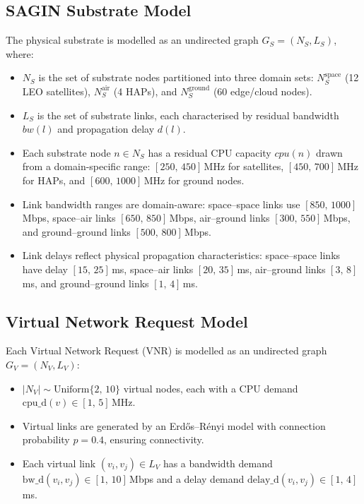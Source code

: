\documentclass[12pt,a4paper]{report}
\begin{document}
\subsection{SAGIN Substrate Model}

The physical substrate is modelled as an undirected graph $G_S = (N_S, L_S)$, where:
\begin{itemize}[leftmargin=*]
  \item $N_S$ is the set of substrate nodes partitioned into three domain sets:
        $N_S^{\text{space}}$ (12 LEO satellites), $N_S^{\text{air}}$ (4 HAPs), and
        $N_S^{\text{ground}}$ (60 edge/cloud nodes).
  \item $L_S$ is the set of substrate links, each characterised by residual bandwidth $bw(l)$
        and propagation delay $d(l)$.
  \item Each substrate node $n \in N_S$ has a residual CPU capacity $cpu(n)$ drawn from a
        domain-specific range: $[250,\,450]$\,MHz for satellites, $[450,\,700]$\,MHz for HAPs,
        and $[600,\,1000]$\,MHz for ground nodes.
  \item Link bandwidth ranges are domain-aware: space--space links use $[850,\,1000]$\,Mbps,
        space--air links $[650,\,850]$\,Mbps, air--ground links $[300,\,550]$\,Mbps, and
        ground--ground links $[500,\,800]$\,Mbps.
  \item Link delays reflect physical propagation characteristics: space--space links have delay
        $[15,\,25]$\,ms, space--air links $[20,\,35]$\,ms, air--ground links $[3,\,8]$\,ms,
        and ground--ground links $[1,\,4]$\,ms.
\end{itemize}

\subsection{Virtual Network Request Model}

Each Virtual Network Request (VNR) is modelled as an undirected graph $G_V = (N_V, L_V)$:
\begin{itemize}[leftmargin=*]
  \item $|N_V| \sim \text{Uniform}\{2,\,10\}$ virtual nodes, each with a CPU demand
        $\text{cpu\_d}(v) \in [1,\,5]$\,MHz.
  \item Virtual links are generated by an Erdős--Rényi model with connection probability
        $p=0.4$, ensuring connectivity.
  \item Each virtual link $(v_i, v_j)\in L_V$ has a bandwidth demand
        $\text{bw\_d}(v_i,v_j)\in[1,\,10]$\,Mbps and a delay demand
        $\text{delay\_d}(v_i,v_j)\in[1,\,4]$\,ms.
\end{itemize}
\end{document}
